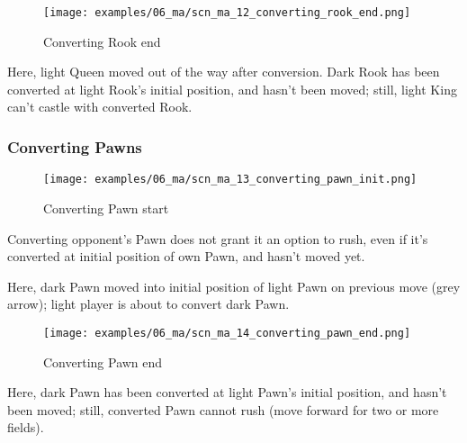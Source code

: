 \noindent
\begin{figure}[!h]
\texttt{[image: examples/06\_ma/scn\_ma\_12\_converting\_rook\_end.png]}
\caption{Converting Rook end}
\label{fig:scn_ma_12_converting_rook_end}
\end{figure}

Here, light Queen moved out of the way after conversion. Dark Rook has been
converted at light Rook's initial position, and hasn't been moved; still,
light King can't castle with converted Rook.

\clearpage %

\subsubsection*{Converting Pawns}
\label{sec:Mayan Ascendancy/Pyramid/Conversion/Converting Pawns}

\vspace*{-1.1\baselineskip}
\noindent
\begin{figure}[!h]
\texttt{[image: examples/06\_ma/scn\_ma\_13\_converting\_pawn\_init.png]}
\caption{Converting Pawn start}
\label{fig:scn_ma_13_converting_pawn_init}
\end{figure}

Converting opponent's Pawn does not grant it an option to rush, even if it's
converted at initial position of own Pawn, and hasn't moved yet.

Here, dark Pawn moved into initial position of light Pawn on previous move
(grey arrow); light player is about to convert dark Pawn.

\clearpage %

\noindent
\begin{figure}[!h]
\texttt{[image: examples/06\_ma/scn\_ma\_14\_converting\_pawn\_end.png]}
\caption{Converting Pawn end}
\label{fig:scn_ma_14_converting_pawn_end}
\end{figure}

Here, dark Pawn has been converted at light Pawn's initial position, and hasn't
been moved; still, converted Pawn cannot rush (move forward for two or more fields).

\clearpage %

